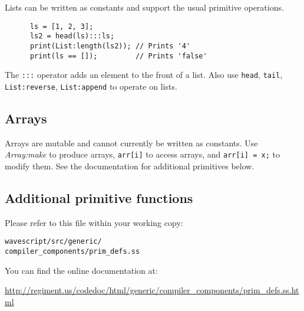 \documentclass[twocolumn]{report}
\begin{document}
Lists can be written as constants and support the usual primitive
operations.  
\begin{verbatim}
      ls = [1, 2, 3];
      ls2 = head(ls):::ls;
      print(List:length(ls2)); // Prints '4'
      print(ls == []);         // Prints 'false'
\end{verbatim}

The {\tt :::} operator adds an element to the front of a list.  Also
use {\tt head}, {\tt tail}, {\tt List:reverse}, {\tt List:append} to operate on
lists. 

\subsection{Arrays}

Arrays are mutable and cannot currently be written as constants.  Use
{\em Array:make} to produce arrays, {\tt arr[i]} to access arrays, and
{\tt arr[i] = x;} to modify them.  See the documentation for
additional primitives below.


\subsection{Additional primitive functions}

Please refer to this file within your working copy:
\vspace{-2mm}
\begin{center}
{\tt{wavescript/src/generic/\\compiler\_components/prim\_defs.ss}}
\end{center}

You can find the online documentation at:
\vspace{-2mm}
\begin{center}
\url{http://regiment.us/codedoc/html/generic/compiler\_components/prim\_defs.ss.html}
\end{center}



\end{document}
